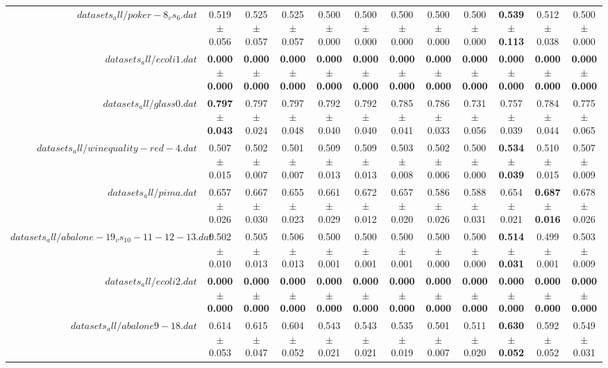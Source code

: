 \begin{table}[!ht]
{\begin{tabular}{r c c c c c c c c c c c}
$datasets_all/poker-8_vs_6.dat$ & 0.519 $\pm$ 0.056 & 0.525 $\pm$ 0.057 & 0.525 $\pm$ 0.057 & 0.500 $\pm$ 0.000 & 0.500 $\pm$ 0.000 & 0.500 $\pm$ 0.000 & 0.500 $\pm$ 0.000 & 0.500 $\pm$ 0.000 & \textbf{0.539 $\pm$ 0.113} & 0.512 $\pm$ 0.038 & 0.500 $\pm$ 0.000 \\
$datasets_all/ecoli1.dat$ & \textbf{0.000 $\pm$ 0.000} & \textbf{0.000 $\pm$ 0.000} & \textbf{0.000 $\pm$ 0.000} & \textbf{0.000 $\pm$ 0.000} & \textbf{0.000 $\pm$ 0.000} & \textbf{0.000 $\pm$ 0.000} & \textbf{0.000 $\pm$ 0.000} & \textbf{0.000 $\pm$ 0.000} & \textbf{0.000 $\pm$ 0.000} & \textbf{0.000 $\pm$ 0.000} & \textbf{0.000 $\pm$ 0.000} \\
$datasets_all/glass0.dat$ & \textbf{0.797 $\pm$ 0.043} & 0.797 $\pm$ 0.024 & 0.797 $\pm$ 0.048 & 0.792 $\pm$ 0.040 & 0.792 $\pm$ 0.040 & 0.785 $\pm$ 0.041 & 0.786 $\pm$ 0.033 & 0.731 $\pm$ 0.056 & 0.757 $\pm$ 0.039 & 0.784 $\pm$ 0.044 & 0.775 $\pm$ 0.065 \\
$datasets_all/winequality-red-4.dat$ & 0.507 $\pm$ 0.015 & 0.502 $\pm$ 0.007 & 0.501 $\pm$ 0.007 & 0.509 $\pm$ 0.013 & 0.509 $\pm$ 0.013 & 0.503 $\pm$ 0.008 & 0.502 $\pm$ 0.006 & 0.500 $\pm$ 0.000 & \textbf{0.534 $\pm$ 0.039} & 0.510 $\pm$ 0.015 & 0.507 $\pm$ 0.009 \\
$datasets_all/pima.dat$ & 0.657 $\pm$ 0.026 & 0.667 $\pm$ 0.030 & 0.655 $\pm$ 0.023 & 0.661 $\pm$ 0.029 & 0.672 $\pm$ 0.012 & 0.657 $\pm$ 0.020 & 0.586 $\pm$ 0.026 & 0.588 $\pm$ 0.031 & 0.654 $\pm$ 0.021 & \textbf{0.687 $\pm$ 0.016} & 0.678 $\pm$ 0.026 \\
$datasets_all/abalone-19_vs_10-11-12-13.dat$ & 0.502 $\pm$ 0.010 & 0.505 $\pm$ 0.013 & 0.506 $\pm$ 0.013 & 0.500 $\pm$ 0.001 & 0.500 $\pm$ 0.001 & 0.500 $\pm$ 0.001 & 0.500 $\pm$ 0.000 & 0.500 $\pm$ 0.000 & \textbf{0.514 $\pm$ 0.031} & 0.499 $\pm$ 0.001 & 0.503 $\pm$ 0.009 \\
$datasets_all/ecoli2.dat$ & \textbf{0.000 $\pm$ 0.000} & \textbf{0.000 $\pm$ 0.000} & \textbf{0.000 $\pm$ 0.000} & \textbf{0.000 $\pm$ 0.000} & \textbf{0.000 $\pm$ 0.000} & \textbf{0.000 $\pm$ 0.000} & \textbf{0.000 $\pm$ 0.000} & \textbf{0.000 $\pm$ 0.000} & \textbf{0.000 $\pm$ 0.000} & \textbf{0.000 $\pm$ 0.000} & \textbf{0.000 $\pm$ 0.000} \\
$datasets_all/abalone9-18.dat$ & 0.614 $\pm$ 0.053 & 0.615 $\pm$ 0.047 & 0.604 $\pm$ 0.052 & 0.543 $\pm$ 0.021 & 0.543 $\pm$ 0.021 & 0.535 $\pm$ 0.019 & 0.501 $\pm$ 0.007 & 0.511 $\pm$ 0.020 & \textbf{0.630 $\pm$ 0.052} & 0.592 $\pm$ 0.052 & 0.549 $\pm$ 0.031 \\

\end{tabular}}
\end{table}
